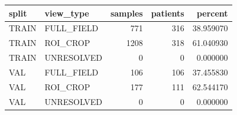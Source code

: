 \begin{tabular}{llrrr}
\toprule
split & view_type & samples & patients & percent \\
\midrule
TRAIN & FULL_FIELD & 771 & 316 & 38.959070 \\
TRAIN & ROI_CROP & 1208 & 318 & 61.040930 \\
TRAIN & UNRESOLVED & 0 & 0 & 0.000000 \\
VAL & FULL_FIELD & 106 & 106 & 37.455830 \\
VAL & ROI_CROP & 177 & 111 & 62.544170 \\
VAL & UNRESOLVED & 0 & 0 & 0.000000 \\
\bottomrule
\end{tabular}
